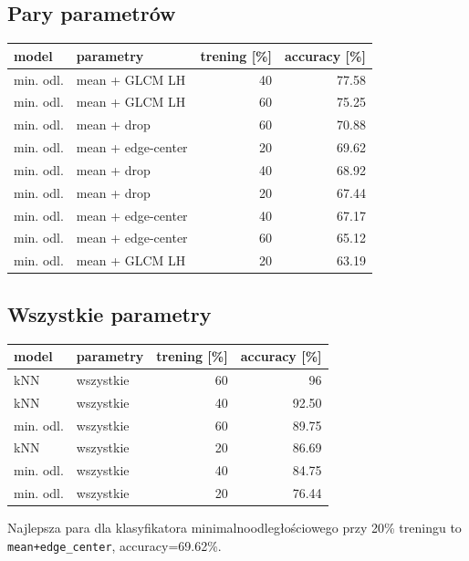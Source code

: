 \documentclass[11pt,a4paper]{article}
\begin{document}
\subsection*{Pary parametrów}
\begin{table}[H]
\centering
\small
\begin{tabular}{llrr}
\toprule
model & parametry & trening [\%] & accuracy [\%] \\
\midrule
min. odl. & mean + GLCM LH & 40 & 77.58 \\
min. odl. & mean + GLCM LH & 60 & 75.25 \\
min. odl. & mean + drop & 60 & 70.88 \\
min. odl. & mean + edge-center & 20 & 69.62 \\
min. odl. & mean + drop & 40 & 68.92 \\
min. odl. & mean + drop & 20 & 67.44 \\
min. odl. & mean + edge-center & 40 & 67.17 \\
min. odl. & mean + edge-center & 60 & 65.12 \\
min. odl. & mean + GLCM LH & 20 & 63.19 \\
\bottomrule
\end{tabular}
\end{table}

\subsection*{Wszystkie parametry}
\begin{table}[H]
\centering
\small
\begin{tabular}{llrr}
\toprule
model & parametry & trening [\%] & accuracy [\%] \\
\midrule
kNN & wszystkie & 60 & 96 \\
kNN & wszystkie & 40 & 92.50 \\
min. odl. & wszystkie & 60 & 89.75 \\
kNN & wszystkie & 20 & 86.69 \\
min. odl. & wszystkie & 40 & 84.75 \\
min. odl. & wszystkie & 20 & 76.44 \\
\bottomrule
\end{tabular}
\end{table}

Najlepsza para dla klasyfikatora minimalnoodległościowego przy 20\% treningu to \texttt{mean+edge\_center}, accuracy=69.62\%.
\end{document}
